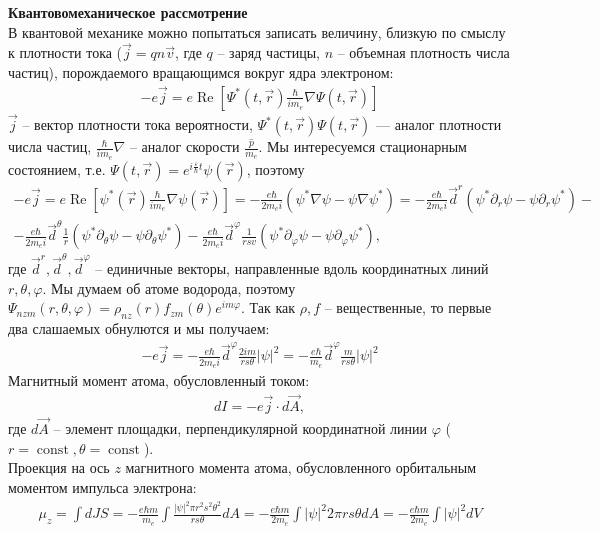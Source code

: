 \documentclass[__main__.tex]{subfiles}
\begin{document}
\textbf{Квантовомеханическое рассмотрение}\\
В квантовой механике можно попытаться записать величину, близкую по смыслу к плотности тока ($\vec{j}=qn\vec{v}$, где $q$ -- заряд частицы, $n$ -- объемная плотность числа частиц), порождаемого вращающимся вокруг ядра электроном:
\begin{gather*}
-e\vec{j}=e\operatorname{Re}\left[\Psi^*(t, \vec{r})\frac{\hbar}{im_e}\nabla\Psi(t, \vec{r})\right]
\end{gather*}
$\vec{j}$ -- вектор плотности тока вероятности, $\Psi^*(t, \vec{r})\Psi(t, \vec{r})$ --- аналог плотности числа частиц, $\frac{\hbar}{im_e}\nabla$ -- аналог скорости $\frac{\hat{p}}{m_e}$. Мы интересуемся стационарным состоянием, т.е. $\Psi(t, \vec{r})=e^{i\frac{\varepsilon}{\hbar}t}\psi(\vec{r})$, поэтому 
\begin{gather*}
-e\vec{j}=e\operatorname{Re}\left[\psi^*(\vec{r})\frac{\hbar}{im_e}\nabla\psi(\vec{r})\right]=-\frac{e\hbar}{2m_ei}\left(\psi^*\nabla\psi-\psi\nabla\psi^*\right)=-\frac{e\hbar}{2m_ei}\vec{d}^r\left(\psi^*\partial_r\psi-\psi\partial_r\psi^*\right)-\\-\frac{e\hbar}{2m_ei}\vec{d}^\theta\frac{1}{r}\left(\psi^*\partial_\theta\psi-\psi\partial_\theta\psi^*\right)-\frac{e\hbar}{2m_ei}\vec{d}^\varphi\frac{1}{rsv}\left(\psi^*\partial_\varphi\psi-\psi\partial_\varphi\psi^*\right), 
\end{gather*}
где $\vec{d}^r, \vec{d}^\theta, \vec{d}^\varphi$ -- единичные векторы, направленные вдоль координатных линий $r, \theta, \varphi$. Мы думаем об атоме водорода, поэтому $\Psi_{nzm}(r, \theta, \varphi)=\rho_{nz}(r)f_{zm}(\theta)e^{im\varphi}$. Так как $\rho, f$ -- вещественные, то первые два слашаемых обнулются и мы получаем:
\begin{gather*}
-e\vec{j}=-\frac{e\hbar}{2m_ei}\vec{d}^\varphi\frac{2im}{rs\theta}|\psi|^2=-\frac{e\hbar}{m_e}\vec{d}^\varphi\frac{m}{rs\theta}|\psi|^2
\end{gather*}
Магнитный момент атома, обусловленный током:
\begin{gather*}
dI=-e\vec{j}\cdot d\vec{A},
\end{gather*}
где $d\vec{A}$ -- элемент площадки, перпендикулярной координатной линии $\varphi$ ($r=\operatorname{const}, \theta=\operatorname{const}$).\\
Проекция на ось $z$ магнитного момента атома, обусловленного орбитальным моментом импульса электрона:
\begin{gather*}
\mu_z=\int dJ S=-\frac{e\hbar m}{m_e}\int \frac{|\psi|^2\pi r^2s^2\theta^2}{rs\theta}dA=-\frac{e\hbar m}{2m_e}\int |\psi|^2 2\pi rs\theta dA=-\frac{e\hbar m}{2m_e}\int |\psi|^2dV
\end{gather*}
\end{document}

